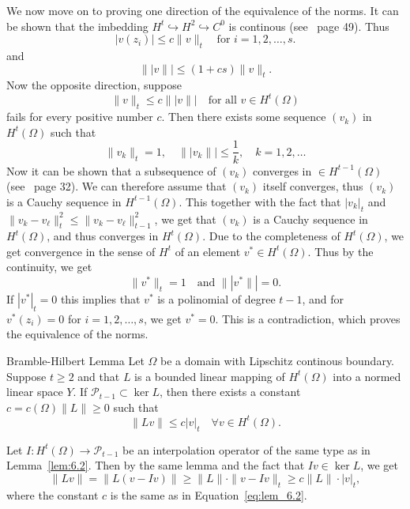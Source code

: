 \begin{bev}
We now move on to proving one direction of the equivalence of the norms. 
It can be shown that the imbedding $H^t\hookrightarrow H^2 \hookrightarrow C^0$ is continous (see~\cite{Braess} page 49). Thus
\begin{equation*}
    |v(z_i)|\leq c\|v\|_t\quad \text{for } i=1,2,\ldots,s.
\end{equation*} 
and
\begin{equation*}
    \||v\||\leq (1+cs)\|v\|_t.
\end{equation*}
Now the opposite direction, suppose 
\begin{equation*}
    \|v\|_t\leq c\||v\||\quad \text{for all } v\in H^t(\Omega)
\end{equation*}
fails for every positive number $c$. Then there exists some sequence $(v_k)$ in $H^t(\Omega)$ such that
\begin{equation*}
    \|v_k\|_t=1,\quad \||v_k\||\leq \frac{1}{k},\quad k=1,2,\ldots
\end{equation*}
Now it can be shown that a subsequence of $(v_k)$ converges in $\in H^{t-1}(\Omega)$ (see~\cite{Braess} page 32). We can therefore assume that $(v_k)$ itself converges, thus $(v_k)$ is a Cauchy sequence in $H^{t-1}(\Omega)$.
This together with the fact that $|v_k|_t$ and $\|v_k-v_\ell\|_t^2\leq\|v_k-v_\ell\|_{t-1}^2$, we get that $(v_k)$ is a Cauchy sequence in $H^t(\Omega)$, and thus converges in $H^t(\Omega)$.
Due to the completeness of $H^t(\Omega)$, we get convergence in the sense of $H^t$ of an element $v^*\in H^t(\Omega)$. 
Thus by the continuity, we get 
\begin{equation}
    \|v^*\|_t = 1\quad \text{and }\||v^*\||=0. 
\end{equation}
If $|v^*|_t = 0$ this implies that $v^*$ is a polinomial of degree $t-1$, and for $v^*(z_i)=0$ for $i=1,2,\ldots,s$, we get $v^*=0$. This is a contradiction, which proves the equivalence of the norms.
\end{bev}

\begin{lem}{Bramble-Hilbert Lemma}
    Let $\Omega$ be a domain with Lipschitz continous boundary. Suppose $t\geq 2$ and that $L$ is a bounded linear mapping of $H^t(\Omega)$ into a normed linear space $Y$.
    If $\mathcal{P}_{t-1}\subset \ker L$, then there exists a constant $c=c(\Omega)\|L\|\geq 0$ such that
    \begin{equation}
        \|Lv\|\leq c|v|_t\quad \forall v\in H^t(\Omega).
    \end{equation}
    \label{lem:Bramble-Hilbert}
\end{lem}
\begin{bev}
    Let $I:H^t(\Omega)\rightarrow \mathcal{P}_{t-1}$ be an interpolation operator of the same type as in Lemma~\ref{lem:6.2}. Then by the same lemma and the fact that $Iv\in\ker L$, we get
    \begin{equation}
        \|Lv\|=\|L(v-Iv)\|\geq \|L\|\cdot\|v-Iv\|_t\geq c\|L\| \cdot |v|_t,
    \end{equation}
    where the constant $c$  is the same as in Equation~\ref{eq:lem_6.2}.~\label{lem:6.3}
\end{bev}